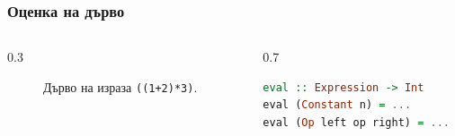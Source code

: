\documentclass{beamer}
\begin{document}
\begin{frame}[fragile]
  \frametitle{Оценка на дърво}


\begin{columns}[t]
  \begin{column}{0.3\textwidth}

    \begin{figure}
      \centering
      \caption{Дърво на израза \texttt{((1+2)*3)}.}
      \label{fig:treeexpr}
      \end{figure}
      

  \end{column}
  \begin{column}{0.7\textwidth}

\begin{lstlisting}[basicstyle=\small,language=Haskell]
eval :: Expression -> Int
eval (Constant n) = ...
eval (Op left op right) = ...
\end{lstlisting}

  \end{column}
\end{columns}

\end{frame}  
\end{document}
